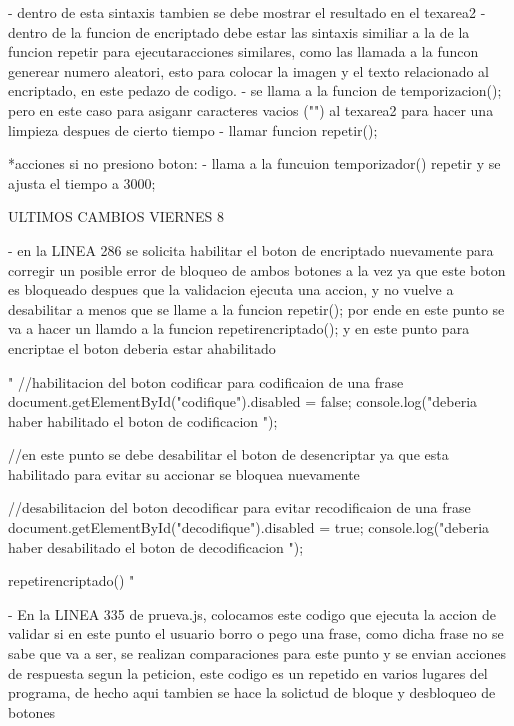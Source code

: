                   - dentro de esta sintaxis tambien se debe mostrar el resultado en el texarea2
                  - dentro de la funcion de encriptado debe estar las sintaxis similiar a la de la funcion repetir para ejecutaracciones similares, como las llamada a la funcon generear numero aleatori, esto para colocar la imagen y el texto relacionado al encriptado, en este pedazo de codigo.
                  - se llama a la  funcion de temporizacion(); pero en este caso para asiganr caracteres vacios ("")  al texarea2 para hacer una limpieza despues de cierto tiempo
                  - llamar funcion repetir();

              *acciones si no presiono boton:
                    - llama a la funcuion temporizador() repetir y se ajusta el tiempo a 3000;

            ULTIMOS CAMBIOS VIERNES 8

            - en la LINEA 286 se solicita habilitar el boton de encriptado nuevamente para corregir un posible error de bloqueo de ambos botones a la vez 
            ya que este boton es bloqueado despues que la validacion ejecuta una accion, y no vuelve a desabilitar a menos que se llame a la funcion repetir();
            por ende en este punto se va a hacer un llamdo a la funcion repetirencriptado(); y en este punto para encriptae el boton deberia estar ahabilitado 
            
            
                    "  //habilitacion del boton codificar para codificaion de una frase 
                        document.getElementById("codifique").disabled = false;
                        console.log("deberia haber habilitado el boton de codificacion ");

                        //en este punto se debe desabilitar el boton de desencriptar ya que esta habilitado para evitar su accionar se bloquea nuevamente
                        
                        //desabilitacion del boton decodificar para evitar recodificaion de una frase 
                        document.getElementById("decodifique").disabled = true;
                        console.log("deberia haber desabilitado el boton de decodificacion ");  

                        repetirencriptado()  "

        
            - En la LINEA 335 de prueva.js, colocamos este codigo que ejecuta la accion de validar si en este punto el usuario borro o pego una frase, como dicha frase 
             no se sabe que va a ser, se realizan comparaciones para este punto y se envian acciones de respuesta segun la peticion, este codigo es un repetido en varios 
             lugares del programa, de hecho aqui tambien se hace la solictud de bloque y desbloqueo de botones 


